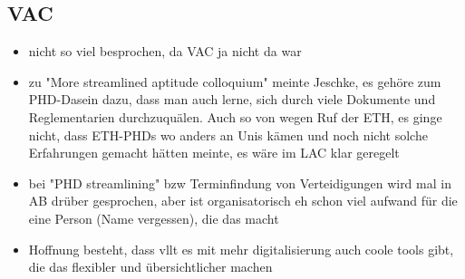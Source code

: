 \documentclass{article}
\begin{document}
\subsection{VAC}
\begin{itemize}
    \item nicht so viel besprochen, da VAC ja nicht da war
    \item zu "More streamlined aptitude colloquium" meinte Jeschke, es gehöre zum PHD-Dasein dazu, dass man auch lerne, sich durch viele Dokumente und Reglementarien durchzuquälen. Auch so von wegen Ruf der ETH, es ginge nicht, dass ETH-PHDs wo anders an Unis kämen und noch nicht solche Erfahrungen gemacht hätten
    \coperet meinte, es wäre im LAC klar geregelt
    \item bei "PHD streamlining" bzw Terminfindung von Verteidigungen wird mal in AB drüber gesprochen, aber ist organisatorisch eh schon viel aufwand für die eine Person (Name vergessen), die das macht
    \item Hoffnung besteht, dass vllt es mit mehr digitalisierung auch coole tools gibt, die das flexibler und übersichtlicher machen

\end{itemize}
\end{document}
